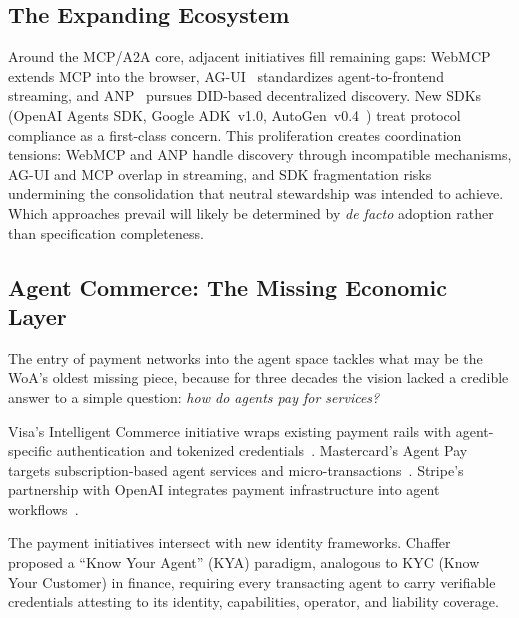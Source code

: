\documentclass[10pt,twocolumn]{article}
\begin{document}
\subsection{The Expanding Ecosystem}\label{sec:ecosystem}

Around the MCP/A2A core, adjacent initiatives fill remaining gaps: WebMCP~\cite{WebMCP_W3C_2025} extends MCP into the browser, AG-UI~\cite{AGUI_2025} standardizes agent-to-frontend streaming, and ANP~\cite{W3C_ANP_2025} pursues DID-based decentralized discovery. New SDKs (OpenAI Agents SDK, Google ADK~v1.0, AutoGen~v0.4~\cite{Microsoft_AutoGen_2023}) treat protocol compliance as a first-class concern.  This proliferation creates coordination tensions: WebMCP and ANP handle discovery through incompatible mechanisms, AG-UI and MCP overlap in streaming, and SDK fragmentation risks undermining the consolidation that neutral stewardship was intended to achieve.  Which approaches prevail will likely be determined by \emph{de facto} adoption rather than specification completeness.

\subsection{Agent Commerce: The Missing Economic Layer}\label{sec:commerce}

The entry of payment networks into the agent space tackles what may be the WoA's oldest missing piece, because for three decades the vision lacked a credible answer to a simple question: \emph{how do agents pay for services?}

Visa's Intelligent Commerce initiative wraps existing payment rails with agent-specific authentication and tokenized credentials~\cite{Visa_TAP_2025}. Mastercard's Agent Pay targets subscription-based agent services and micro-transactions~\cite{Mastercard_AgentPay_2025}. Stripe's partnership with OpenAI integrates payment infrastructure into agent workflows~\cite{Stripe_OpenAI_ACP_2025}.

The payment initiatives intersect with new identity frameworks. Chaffer~\cite{KYA_Paradigm_2025} proposed a ``Know Your Agent'' (KYA) paradigm, analogous to KYC (Know Your Customer) in finance, requiring every transacting agent to carry verifiable credentials attesting to its identity, capabilities, operator, and liability coverage.


\end{document}
